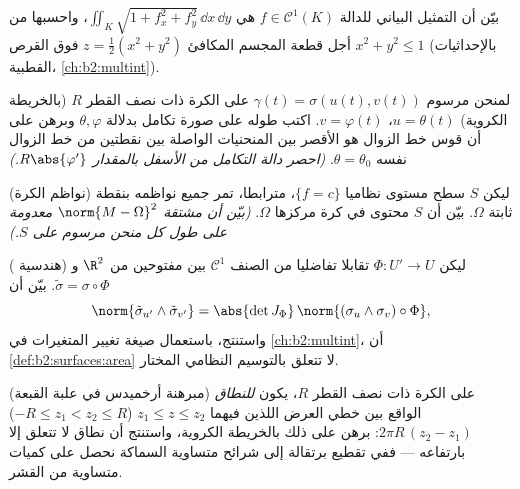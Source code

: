 \begin{exercise}[$\star\star$]\label{exo:b2:surfaces:5}
بيّن أن  التمثيل البياني للدالة $f \in \mathcal{C}^1(K)$ هي $\iint_K \sqrt{1 + f_x^2 + f_y^2}\,\dd x\,\dd y$، واحسبها من
أجل قطعة المجسم المكافئ $z = \frac12(x^2 + y^2)$ فوق القرص $x^2 + y^2 \leq 1$ (بالإحداثيات
القطبية، \cref{ch:b2:multint}).
\end{exercise}

\begin{exercise}[$\star\star$]\label{exo:b2:surfaces:6}
لمنحن مرسوم $\gamma(t) = \sigma(u(t), v(t))$ على الكرة ذات نصف القطر $R$ (بالخريطة
الكروية) $u = \theta(t)$، $v =
\varphi(t)$. اكتب طوله على صورة تكامل بدلالة $\theta, \varphi$
وبرهن على أن قوس خط الزوال هو الأقصر بين المنحنيات الواصلة بين نقطتين
من خط الزوال نفسه $\theta = \theta_0$. \emph{(احصر دالة التكامل من الأسفل
بالمقدار $R\abs{\varphi'}$.)}
\end{exercise}

\begin{exercise}[$\star\star\star$]\label{exo:b2:surfaces:7}
(نواظم الكرة) ليكن $S$ سطح مستوى نظاميا $\{f = c\}$، مترابطا، تمر
جميع نواظمه بنقطة ثابتة $\Omega$. بيّن أن $S$ محتوى في كرة مركزها
$\Omega$. \emph{(بيّن أن مشتقة $\norm{M - \Omega}^2$ معدومة على طول كل منحن مرسوم
على $S$.)}
\end{exercise}

\begin{exercise}[$\star\star\star$]\label{exo:b2:surfaces:8}
( هندسية) ليكن $\Phi \colon U' \to U$ تقابلا تفاضليا من الصنف $\mathcal{C}^1$ بين
مفتوحين من $\R^2$ و$\tilde\sigma =
\sigma \circ \Phi$. بيّن أن
\[
\norm{\tilde\sigma_{u'} \wedge \tilde\sigma_{v'}}
= \abs{\det J_\Phi}\,
\norm{(\sigma_u \wedge \sigma_v)\circ\Phi} ,
\]
واستنتج، باستعمال صيغة تغيير المتغيرات في \cref{ch:b2:multint}، أن  \cref{def:b2:surfaces:area}
لا تتعلق بالتوسيم النظامي المختار.
\end{exercise}

\begin{exercise}[$\star$]\label{exo:b2:surfaces:9}
(مبرهنة أرخميدس في علبة القبعة) على الكرة ذات نصف القطر $R$،
يكون \emph{للنطاق} الواقع بين خطي العرض اللذين فيهما $z_1 \leq z \leq z_2$
($-R \leq z_1 < z_2 \leq R$)  $2\pi R\,(z_2 - z_1)$: برهن على ذلك بالخريطة الكروية، واستنتج أن
 نطاق لا تتعلق إلا بارتفاعه --- ففي تقطيع برتقالة إلى شرائح
متساوية السماكة نحصل على كميات متساوية من القشر.
\end{exercise}

